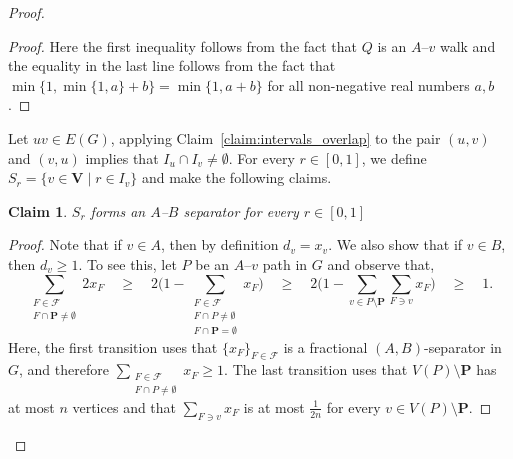 \documentclass[11pt]{amsart}
\newtheorem{claim}{Claim}[theorem]
\begin{document}
\begin{proof}
\begin{proof}
    Here the first inequality follows from the fact that $Q$ is an $A$--$v$ walk and the equality in the last line follows from the fact that $\min\{1,\min\{1,a\}+b\} = \min\{1, a+b\}$ for all non-negative real numbers $a,b$.
    \end{proof}
    
    Let $uv\in E(G)$, applying Claim~\ref{claim:intervals_overlap} to the pair $(u,v)$ and $(v,u)$ implies that $I_u \cap I_v \neq \emptyset$.
    For every $r \in [0,1]$, we define $S_r = \{ v \in \mathbf{V} \mid r \in I_v \}$ and make the following claims. 
    \begin{claim}\label{claim:S_r_is_A-B_sep}
        $S_r$ forms an $A$--$B$ separator for every $r\in [0,1]$
    \end{claim}
    
    \begin{proof}
        Note that if $v\in A$, then by definition $d_v = x_v$. We also show that if $v\in B$, then $d_v \geq 1$. To see this, let $P$ be an $A$--$v$ path in $G$ and observe that,
        $$
        \sum_{\substack{F \in \mathcal{F}\\ F \cap \mathbf{P} \neq \emptyset}} 2x_F \quad
        \geq \quad 2\bigl( 1 - \sum_{\substack{ F \in \mathcal{F} \\ F \cap P \neq \emptyset \\ F \cap \mathbf{P} = \emptyset}} x_F \bigr)\quad
        \geq \quad 2\bigl( 1 - \sum_{v \in P\setminus \mathbf{P}}\sum_{F \ni v} x_F \bigr) \quad
        \geq \quad  1.
        $$
        Here, the first transition uses that $\{x_F\}_{F\in\mathcal{F}}$ is a fractional $(A,B)$-separator in $G$, and therefore $\sum_{\substack{ F \in \mathcal{F} \\ F \cap P \neq \emptyset}}x_F \geq 1$. The last transition uses that $V(P)\setminus \mathbf{P}$ has at most $n$ vertices and that $\sum_{F \ni v} x_F$ is at most $\frac{1}{2n}$ for every $v \in V(P)\setminus \mathbf{P}$. 
        

\end{proof}
\end{proof}
\end{document}
